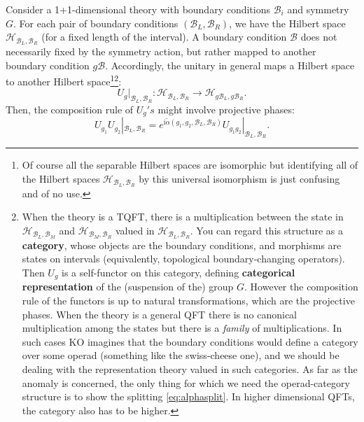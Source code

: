 \documentclass[
]{scrartcl}
\numberwithin{equation}{section}
\theoremstyle{definition}
\theoremstyle{definition}
\theoremstyle{definition}
\theoremstyle{definition}
\theoremstyle{remark}
\begin{document}
Consider a 1+1-dimensional theory with boundary conditions \(\mathcal{B}_i\)
and symmetry \(G\).
For each pair of boundary conditions \((\mathcal{B}_L,\mathcal{B}_R)\), we have the Hilbert space \(\mathcal{H}_{\mathcal{B}_L,\mathcal{B}_R}\) (for a fixed length of the interval).
A boundary condition \(\mathcal{B}\) does not necessarily fixed by the symmetry action, but rather mapped to another boundary condition \(g\mathcal{B}\).
Accordingly, the unitary in general maps a Hilbert space to another Hilbert space\footnote{Of course all the separable Hilbert spaces are isomorphic but identifying all of the Hilbert spaces \(\mathcal{H}_{\mathcal{B}_L,\mathcal{B}_R}\) by this universal isomorphism is just confusing and of no use.}\footnote{When the theory is a TQFT, there is a multiplication between the state in \(\mathcal{H}_{\mathcal{B}_L,\mathcal{B}_M}\) and \(\mathcal{H}_{\mathcal{B}_M,\mathcal{B}_R}\) valued in \(\mathcal{H}_{\mathcal{B}_L,\mathcal{B}_R}\). You can regard this structure as a \textbf{category}, whose objects are the boundary conditions, and morphisms are states on intervals (equivalently, topological boundary-changing operators).
  Then \(U_g\) is a self-functor on this category, defining \textbf{categorical representation} of the (suspension of the) group \(G\).
  However the composition rule of the functors is up to natural transformations, which are the projective phases.
  When the theory is a general QFT there is no canonical multiplication among the states but there is a \emph{family} of multiplications. In such cases KO imagines that the boundary conditions would define a category over some operad (something like the swiss-cheese one), and we should be dealing with the representation theory valued in such categories.
  As far as the anomaly is concerned, the only thing for which we need the operad-category structure is to show the splitting \eqref{eq:alphasplit}.
  In higher dimensional QFTs, the category also has to be higher.}:
\begin{equation}
    \label{eq:UgB}
    U_g|_{\mathcal{B}_L,\mathcal{B}_R} : \mathcal{H}_{\mathcal{B}_L,\mathcal{B}_R} \to \mathcal{H}_{g\mathcal{B}_L,g\mathcal{B}_R}.
\end{equation}
Then, the composition rule of \(U_g's\) might involve projective phases:
\begin{equation}
    \label{eq:UBproj}
    U_{g_1}U_{g_2}|_{\mathcal{B}_L,\mathcal{B}_R} = e^{\mathrm{i}\tilde{\alpha}(g_1,g_2,\mathcal{B}_L,\mathcal{B}_R)}U_{g_1g_2}|_{\mathcal{B}_L,\mathcal{B}_R}.
\end{equation}
\end{document}
